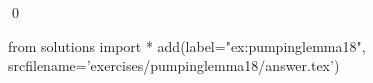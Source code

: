 
\begin{ex} 
  \label{ex:pumpinglemma18}
  
  \qed
\end{ex} 
\begin{python0}
from solutions import *
add(label="ex:pumpinglemma18",
    srcfilename='exercises/pumpinglemma18/answer.tex') 
\end{python0}
